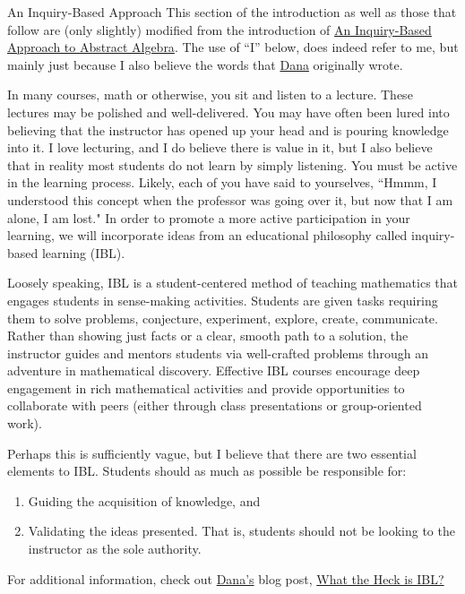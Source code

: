 \begin{section}{An Inquiry-Based Approach}
This section of the introduction as well as those that follow are (only slightly) modified from the introduction of  \href{https://github.com/dcernst/IBL-AbstractAlgebra/blob/master/Spring2018/IBL-AbstractAlgebra.pdf}{An Inquiry-Based Approach to Abstract Algebra}. The use of ``I'' below, does indeed refer to me, but mainly just because I also believe the words that \href{https://danaernst.com}{Dana} originally wrote.

In many courses, math or otherwise, you sit and listen to a lecture. These lectures may be polished and well-delivered. You may have often been lured into believing that the instructor has opened up your head and is pouring knowledge into it. I  love lecturing, and I do believe there is value in it, but I also believe that in reality most students do not learn by simply listening. You must be active in the learning process. Likely, each of you have said to yourselves, ``Hmmm, I understood this concept when the professor was going over it, but now that I am alone, I am lost." In order to promote a more active participation in your learning, we will incorporate ideas from an educational philosophy called inquiry-based learning (IBL).

Loosely speaking, IBL is a student-centered method of teaching mathematics that engages students in sense-making activities.  Students are given tasks requiring them to solve problems, conjecture, experiment, explore, create, communicate.  Rather than showing just facts or a clear, smooth path to a solution, the instructor guides and mentors students via well-crafted problems through an adventure in mathematical discovery.  Effective IBL courses encourage deep engagement in rich mathematical activities and provide opportunities to collaborate with peers (either through class presentations or group-oriented work).

Perhaps this is sufficiently vague, but I believe that there are two essential elements to IBL.  Students should as much as possible be responsible for:
\begin{enumerate}
\item Guiding the acquisition of knowledge, and
\item Validating the ideas presented.  That is, students should not be looking to the instructor as the sole authority.
\end{enumerate}
\noindent For additional information, check out \href{https://danaernst.com}{Dana's} blog post, \href{http://maamathedmatters.blogspot.com/2013/05/what-heck-is-ibl.html}{What the Heck is IBL?}


\end{section}

